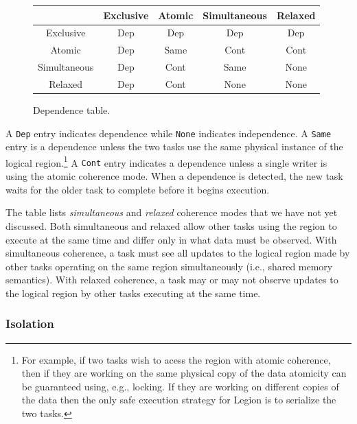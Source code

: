\begin{figure}
{\small
\begin{tabular}{c|cccc}
             & Exclusive & Atomic   & Simultaneous & Relaxed \\
\midrule
Exclusive    & Dep & Dep & Dep & Dep \\ 
Atomic       & Dep & Same & Cont & Cont \\
Simultaneous & Dep & Cont & Same & None \\
Relaxed      & Dep & Cont & None & None \\
\end{tabular}
}
\caption{Dependence table.}
\label{fig:dependence}
\end{figure}
A {\tt Dep} entry indicates dependence while {\tt None}
indicates independence.  A {\tt Same} entry is a dependence unless the two tasks
use the same physical instance of the logical region.\footnote{For example, if two tasks wish to acess the region with atomic coherence, then if they are working on the same physical copy of the data atomicity can be guaranteed using, e.g., locking.  If they are working on different copies of the data then the only safe execution strategy for Legion is to serialize the two tasks.}
A {\tt Cont} entry
indicates a dependence unless a single writer is using the
atomic coherence mode.  When a dependence is detected, the new task
waits for the older task to complete before it begins execution.

The table lists {\em simultaneous} and {\em relaxed} coherence modes
that we have not yet discussed.  Both simultaneous and relaxed
allow other tasks using the region to execute at the same time and differ
only in what data must be observed.  With simultaneous coherence, a task must 
see all updates to the logical region made by other tasks operating on the same region 
simultaneously (i.e., shared memory semantics).  With relaxed coherence, 
a task may or may not observe updates to the logical region by other tasks executing at
the same time.


\subsubsection{Isolation}

